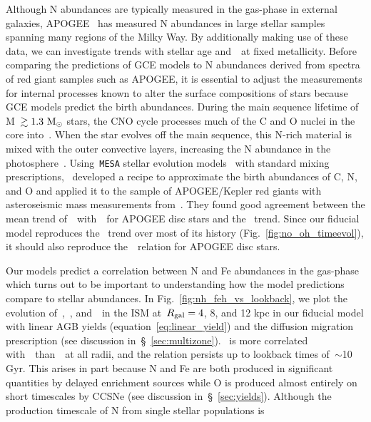 \documentclass[ms.tex]{subfiles}
\begin{document}
Although N abundances are typically measured in the gas-phase in external
galaxies, APOGEE~\citep{Majewski2017} has measured N abundances in large
stellar samples spanning many regions of the Milky Way.
By additionally making use of these data, we can investigate trends with
stellar age and~\ofe~at fixed metallicity.
Before comparing the predictions of GCE models to N abundances derived from
spectra of red giant samples such as APOGEE, it is essential to adjust the
measurements for internal processes known to alter the surface compositions of
stars because GCE models predict the birth abundances.
During the main sequence lifetime of M~$\gtrsim 1.3~\text{M}_\odot$ stars, the CNO cycle
processes much of the C and O nuclei in the core into~\Nfourteen.
When the star evolves off the main sequence, this N-rich material is mixed with
the outer convective layers, increasing the N abundance in the
photosphere~\citep{Gilroy1989, Korn2007, Lind2008, Souto2018, Souto2019}.
Using~\texttt{MESA} stellar evolution models~\citep{Paxton2011, Paxton2013,
Paxton2015, Paxton2018} with standard mixing prescriptions,~\citet{Vincenzo2021}
developed a recipe to approximate the birth abundances of C, N, and O and
applied it to the sample of APOGEE/Kepler red giants with asteroseismic mass
measurements from~\citet{Miglio2021}.
They found good agreement between the mean trend of~\no~with~\oh~for APOGEE
disc stars and the~\citet{Dopita2016} trend.
Since our fiducial model reproduces the~\citet{Dopita2016} trend over most of
its history (Fig.~\ref{fig:no_oh_timeevol}), it should also reproduce
the~\ohno~relation for APOGEE disc stars.
\par
Our models predict a correlation between N and Fe abundances in
the gas-phase which turns out to be important to understanding how the model
predictions compare to stellar abundances.
In Fig.~\ref{fig:nh_feh_vs_lookback}, we plot the evolution of~\nh,~\oh,
and~\feh~in the ISM at~$R_\text{gal} = 4$, 8, and 12 kpc in our fiducial model with
linear AGB yields (equation~\ref{eq:linear_yield}) and the diffusion migration
prescription (see discussion in~\S~\ref{sec:multizone}).
\nh~is more correlated with~\feh~than~\oh~at all radii, and the relation
persists up to lookback times of~$\sim$10 Gyr.
This arises in part because N and Fe are both produced in significant
quantities by delayed enrichment sources while O is produced almost entirely on
short timescales by CCSNe (see discussion in~\S~\ref{sec:yields}).
Although the production timescale of N from single stellar populations is
\end{document}
